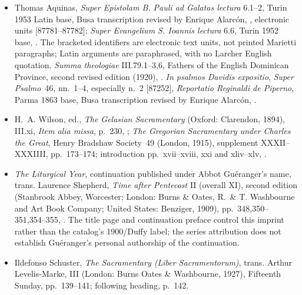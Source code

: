 {\begin{itemize}[leftmargin=1.1em,labelsep=0.35em,itemsep=0.10em,topsep=0.15em,parsep=0pt]
\item Thomas Aquinas, \emph{Super Epistolam B. Pauli ad Galatas lectura}
6.1--2, Turin 1953 Latin base, Busa transcription revised by Enrique
Alarcón, ,
electronic units [87781--87782];
\emph{Super Evangelium S. Ioannis lectura} 6.6, Turin 1952 base,
.
The bracketed identifiers are electronic text units, not printed Marietti
paragraphs; Latin arguments are paraphrased, with no Larcher English
quotation. \emph{Summa theologiae} III.79.1--3,6, Fathers of the
English Dominican Province, second revised edition (1920),
.
\emph{In psalmos Davidis expositio},
\emph{Super Psalmo}~46, nn.~1--4, especially n.~2 [87252],
\emph{Reportatio Reginaldi de Piperno}, Parma 1863 base, Busa
transcription revised by Enrique Alarcón,
.

\item H.~A. Wilson, ed., \emph{The Gelasian Sacramentary}
(Oxford: Clarendon, 1894), III.xi, \emph{Item alia missa}, p.~230,
;
\emph{The Gregorian Sacramentary under Charles the Great}, Henry Bradshaw
Society~49 (London, 1915), supplement XXXII--XXXIIII,
pp.~173--174; introduction pp.~xvii--xviii, xxi and xliv--xlv,
.

\item \emph{The Liturgical Year}, continuation published under Abbot
Guéranger's name, trans. Laurence Shepherd, \emph{Time after Pentecost}
II (overall XI), second edition (Stanbrook Abbey, Worcester;
London: Burns \& Oates, R.~\& T. Washbourne and Art Book Company;
United States: Benziger, 1909), pp.~348,350--351,354--355,
.
The title page and continuation preface control this imprint rather than
the catalog's 1900/Duffy label; the series attribution does not establish
Guéranger's personal authorship of the continuation.

\item Ildefonso Schuster, \emph{The Sacramentary (Liber Sacramentorum)},
trans. Arthur Levelis-Marke, III (London: Burns Oates \& Washbourne,
1927), Fifteenth Sunday, pp.~139--141; following heading, p.~142.


\end{itemize}}
